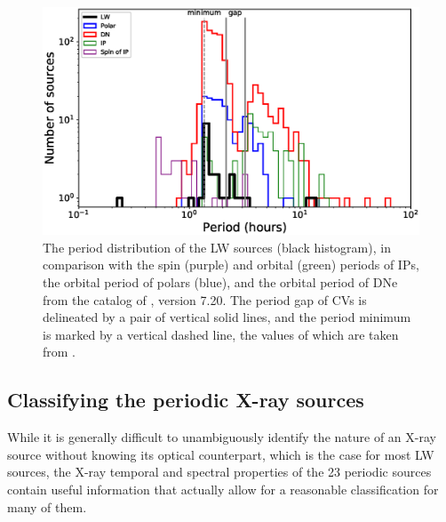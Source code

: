\documentclass[fleqn,usenatbib]{mnras}
\begin{document}
\begin{figure}
\centering
\includegraphics[scale=0.73]{./figure/CV/N_P.eps}
\caption{The period distribution of the LW sources (black histogram), in comparison with the spin (purple) and orbital (green) periods of IPs, the orbital period of polars (blue), and the orbital period of DNe from the catalog of \citet{2003A&A...404..301R}, version 7.20. The period gap of CVs is delineated by a pair of vertical solid lines, and the period minimum is marked by a vertical dashed line, the values of which are taken from \citet{2011ApJS..194...28K}.\label{fig:N_P}}
\end{figure}

\subsection{Classifying the periodic X-ray sources}
\label{subsec:class}
While it is generally difficult to unambiguously identify the nature of an X-ray source without knowing its optical counterpart, which is the case for most LW sources, the X-ray temporal and spectral properties of the 23 periodic sources contain useful information that actually allow for a reasonable classification for many of them. 
\end{document}
